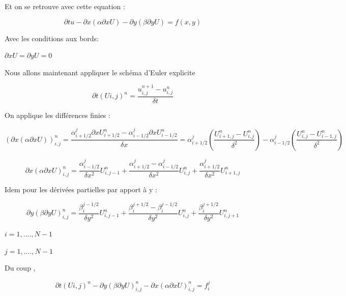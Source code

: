 \documentclass[a4paper,12pt,twoside]{report}
\begin{document}
Et on se retrouve avec cette equation :

\begin{equation}
\partial{t} u-\partial{x}(\alpha \partial{x}U)-\partial{y}(\beta \partial{y}U)=f(x,y)
\end{equation}


Avec les conditions aux bords:

$\partial{x}U=\partial{y}U=0$

Nous allons maintenant appliquer le schéma d'Euler explicite 

\begin{equation}
\partial{t} (U{i,j} )^n=\frac{u_{i,j}^{n+1}-u_{i,j}^n}{\delta t}
\end{equation}

On applique les différences finies :

\begin{equation}
(\partial{x}(\alpha \partial{x}U))_{i,j}^n=\frac{\alpha_{i+1/2}^j\partial{x}U_{i+1/2}^n-\alpha_{i-1/2}^j\partial{x}U_{i-1/2}^n}{\delta x}=\alpha_{i+1/2}^j(\frac{U_{i+1,j}^n-U_{i,j}^n}{\delta^2})-\alpha_{i-1/2}^j(\frac{U_{i,j}^n-U_{i-1,j}^n}{\delta^2})
\end{equation}



\begin{equation}
\partial{x}(\alpha \partial{x}U)_{i,j}^n=\frac{\alpha_{i-1/2}^j}{\delta x^2}U_{i,j-1}^n+\frac{\alpha_{i+1/2}^j-\alpha_{i-1/2}^j}{\delta x^2}U_{i,j}^n +\frac{\alpha_{i+1/2}^j}{\delta x^2}U_{i+1,j}^n
\end{equation}



 Idem pour les dérivées partielles par apport à y : 

\begin{equation}
\partial{y}(\beta \partial{y}U)_{i,j}^n=\frac{\beta_i^{j-1/2}}{\delta y^2}U_{i,j-1}^n+\frac{\beta_{i}^{j+1/2}-\beta_{i}^{j-1/2}}{\delta y^2}U_{i,j}^n +\frac{\beta_{i}^{j+1/2}}{\delta y^2}U_{i,j+1}^n
\end{equation}



$i=1,....,N-1$


$j=1,....,N-1$


Du coup , 

\begin{equation}
\partial{t} (U{i,j} )^n -\partial{y}(\beta \partial{y}U)_{i,j}^n-\partial{x}(\alpha \partial{x}U)_{i,j}^n=f_i^j
\end{equation}
\end{document}
